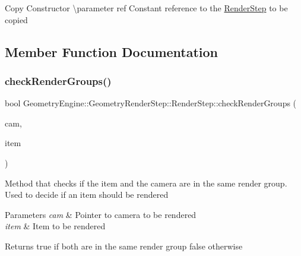 Copy Constructor \textbackslash{}parameter ref Constant reference to the \mbox{\hyperlink{class_geometry_engine_1_1_geometry_render_step_1_1_render_step}{Render\+Step}} to be copied 

\subsection{Member Function Documentation}
\mbox{\label{class_geometry_engine_1_1_geometry_render_step_1_1_render_step_ad5895ae71a3b7ff4c0ec10cb07ea0195}} 
\subsubsection{\texorpdfstring{checkRenderGroups()}{checkRenderGroups()}}
{\footnotesize\ttfamily bool Geometry\+Engine\+::\+Geometry\+Render\+Step\+::\+Render\+Step\+::check\+Render\+Groups (\begin{DoxyParamCaption}\item[{\mbox{\hyperlink{class_geometry_engine_1_1_geometry_world_item_1_1_geometry_camera_1_1_camera}{Geometry\+World\+Item\+::\+Geometry\+Camera\+::\+Camera}} $\ast$}]{cam,  }\item[{\mbox{\hyperlink{class_geometry_engine_1_1_geometry_world_item_1_1_geometry_item_1_1_geometry_item}{Geometry\+World\+Item\+::\+Geometry\+Item\+::\+Geometry\+Item}} $\ast$}]{item }\end{DoxyParamCaption})\hspace{0.3cm}{\ttfamily [protected]}}

Method that checks if the item and the camera are in the same render group. Used to decide if an item should be rendered 
\begin{DoxyParams}{Parameters}
{\em cam} & Pointer to camera to be rendered \\
\hline
{\em item} & Item to be rendered \\
\hline
\end{DoxyParams}
\begin{DoxyReturn}{Returns}
true if both are in the same render group false otherwise 
\end{DoxyReturn}
\mbox{\label{class_geometry_engine_1_1_geometry_render_step_1_1_render_step_afe33ea9d82c5be11f55af7d39691d44b}} 
